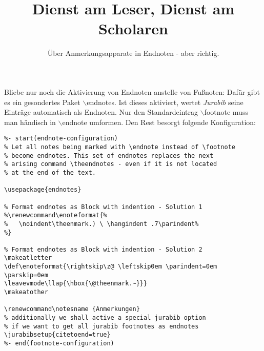 \documentclass[
  DIV=calc,
  BCOR=5mm,
  11pt,
  smallheadings,
  oneside,
  abstract=true,
  toc=bib,
  english,ngerman]{scrartcl}
\makeatletter
\def\enoteformat{\rightskip\z@ \leftskip0em \parindent=0em \parskip=0em
\leavevmode\llap{\hbox{\@theenmark.~}}}
\renewcommand\notesname{Anmerkungen}
\makeatother
\begin{document}

\titlehead{fodina.csr.howto-: the mykeds Classical
Scholar Research framework}
\subject{(Geistes-) Wissenschaftliche Texte mit \textit{jurabib}}
\title{Dienst am Leser, Dienst am Scholaren}
\subtitle{Über Anmerkungsapparate in Endnoten - aber richtig.}

\maketitle



\footnotesize
\tableofcontents
\normalsize







Bliebe nur noch die Aktivierung von Endnoten anstelle von Fußnoten: Dafür gibt es
ein gesondertes Paket $\backslash$endnotes. Ist dieses aktiviert, wertet
\emph{Jurabib} seine Einträge automatisch als Endnoten. Nur den Standardeintrag
$\backslash$footnote muss man händisch in $\backslash$endnote umformen. Den Rest
besorgt folgende Konfiguration:
\small
\begin{verbatim}
%- start(endnote-configuration)
% Let all notes being marked with \endnote instead of \footnote
% become endnotes. This set of endnotes replaces the next 
% arising command \theendnotes - even if it is not located
% at the end of the text.

\usepackage{endnotes}

% Format endnotes as Block with indention - Solution 1
%\renewcommand\enoteformat{%
%   \noindent\theenmark.) \ \hangindent .7\parindent%
%}

% Format endnotes as Block with indention - Solution 2
\makeatletter
\def\enoteformat{\rightskip\z@ \leftskip0em \parindent=0em \parskip=0em
\leavevmode\llap{\hbox{\@theenmark.~}}}
\makeatother

\renewcommand\notesname {Anmerkungen}
% additionally we shall active a special jurabib option
% if we want to get all jurabib footnotes as endnotes
\jurabibsetup{citetoend=true}
%- end(footnote-configuration)

\end{verbatim}
\normalsize





\small



\printnomenclature

\theendnotes

\end{document}
